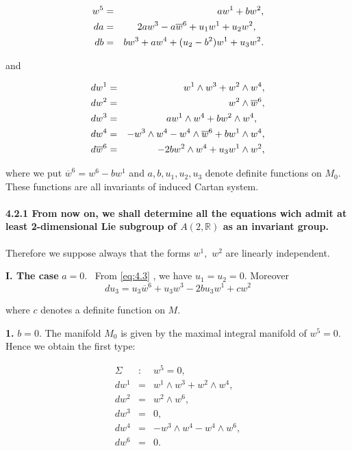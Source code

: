 \documentclass{amsproc}
\theoremstyle{remark}
\numberwithin{equation}{section}
\begin{document}
\begin{eqnarray}
w^{5} &=&aw^{1}+bw^{2}, \notag \\
da &=&2aw^{3}-a\overline{w}^{6}+u_{1}w^{1}+u_{2}w^{2},
 \label{eq:4.3}
  \text{\ \ } \\
db &=&bw^{3}+aw^{4}+(u_{2}-b^{2})w^{1}+u_{3}w^{2}. \notag
\end{eqnarray}

and

\begin{eqnarray}
dw^{1} &=&w^{1}\wedge w^{3}+w^{2}\wedge w^{4}, \notag \\
dw^{2} &=&w^{2}\wedge \overline{w}^{6}, \notag \\
dw^{3} &=&aw^{1}\wedge w^{4}+bw^{2}\wedge w^{4},
 \label{eq:4.4}
  \text{\ \ } \\
dw^{4} &=&-w^{3}\wedge w^{4}-w^{4}\wedge \overline{w}^{6}+bw^{1}\wedge w^{4},
\notag\\
d\overline{w}^{6} &=&-2bw^{2}\wedge w^{4}+u_{3}w^{1}\wedge w^{2}, \notag
\end{eqnarray}

where we put $\overline{w}^{6}=w^{6}-bw^{1}$ and $a,b,u_{1},u_{2},u_{3}$
denote definite functions on $M_{0}.$ These functions are all invariants of
induced Cartan system.

\paragraph{4.2.1 From now on, we shall determine all the equations wich
admit at least 2-dimensional Lie subgroup of $A(2,\mathbb{R}
)$ as an invariant group.}

Therefore we suppose always that the forms $w^{1},$ $w^{2}$ are linearly
independent.

\textbf{I. The case }$a=0$. \ From \eqref{eq:4.3} , we have $u_{1}=u_{2}=0$.
Moreover
\begin{equation}\label{eq:4.5}
du_{3}=u_{3}\overline{w}^{6}+u_{3}w^{3}-2bu_{3}w^{1}+cw^{2}
\end{equation}

where $c$ denotes a definite function on $M$.

\textbf{1. }$b=0.$ The manifold $M_{0}$ is given by the maximal integral
manifold of $w^{5}=0.$ Hence we obtain the first type:

\begin{eqnarray*}
\Sigma &:&w^{5}=0, \\
dw^{1} &=&w^{1}\wedge w^{3}+w^{2}\wedge w^{4}, \\
dw^{2} &=&w^{2}\wedge w^{6}, \\
dw^{3} &=&0, \\
dw^{4} &=&-w^{3}\wedge w^{4}-w^{4}\wedge w^{6}, \\
dw^{6} &=&0.
\end{eqnarray*}
\end{document}
